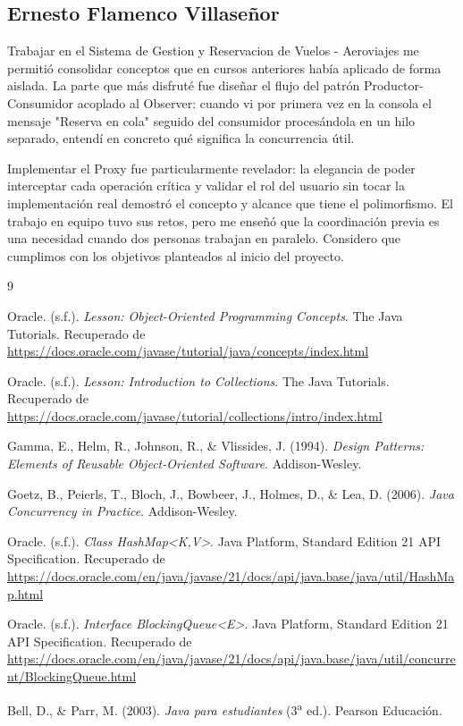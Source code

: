 \documentclass[12pt, letterpaper]{article}
\begin{document}
	\subsection{Ernesto Flamenco Villaseñor}
	Trabajar en el Sistema de Gestion y Reservacion de Vuelos - Aeroviajes me permitió consolidar conceptos que en cursos anteriores había aplicado de forma aislada. La parte que más disfruté fue diseñar el flujo del patrón Productor-Consumidor acoplado al Observer: cuando vi por primera vez en la consola el mensaje "Reserva en cola" seguido del consumidor procesándola en un hilo separado, entendí en concreto qué significa la concurrencia útil.
	
	Implementar el Proxy fue particularmente revelador: la elegancia de poder interceptar cada operación crítica y validar el rol del usuario sin tocar la implementación real demostró el concepto y alcance que tiene el polimorfismo. El trabajo en equipo tuvo sus retos, pero me enseñó que la coordinación previa es una necesidad cuando dos personas trabajan en paralelo. Considero que cumplimos con los objetivos planteados al inicio del proyecto.
	
	\newpage
	\renewcommand{\refname}{Bibliografía}
	\begin{thebibliography}{9}
		
		Oracle. (s.f.). \textit{Lesson: Object-Oriented Programming Concepts}. The Java Tutorials. Recuperado de \url{https://docs.oracle.com/javase/tutorial/java/concepts/index.html}
		
		Oracle. (s.f.). \textit{Lesson: Introduction to Collections}. The Java Tutorials. Recuperado de \url{https://docs.oracle.com/javase/tutorial/collections/intro/index.html}
		
		Gamma, E., Helm, R., Johnson, R., \& Vlissides, J. (1994). \textit{Design Patterns: Elements of Reusable Object-Oriented Software}. Addison-Wesley.
		
		Goetz, B., Peierls, T., Bloch, J., Bowbeer, J., Holmes, D., \& Lea, D. (2006). \textit{Java Concurrency in Practice}. Addison-Wesley.
		
		Oracle. (s.f.). \textit{Class HashMap<K,V>}. Java Platform, Standard Edition 21 API Specification. Recuperado de \url{https://docs.oracle.com/en/java/javase/21/docs/api/java.base/java/util/HashMap.html}
		
		Oracle. (s.f.). \textit{Interface BlockingQueue<E>}. Java Platform, Standard Edition 21 API Specification. Recuperado de \url{https://docs.oracle.com/en/java/javase/21/docs/api/java.base/java/util/concurrent/BlockingQueue.html}
		
		Bell, D., \& Parr, M. (2003). \textit{Java para estudiantes} (3\textsuperscript{a} ed.). Pearson Educación.
		
	\end{thebibliography}
	
\end{document}
